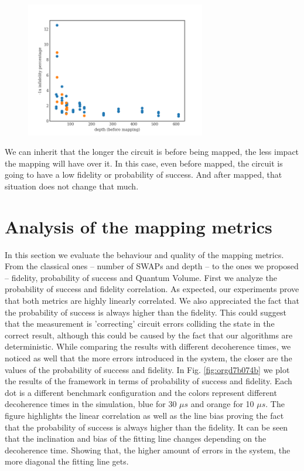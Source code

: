 \begin{figure}[htbp]
\centering
\includegraphics[width=0.7\textwidth]{figures/infid_percentage_depth_before_mapping.png}
\caption{\label{fig:org8ea3009}
}
\end{figure}

We can inherit that the longer the circuit is before being mapped, the less impact the mapping will have over it.
In this case, even before mapped, the circuit is going to have a low fidelity or probability of success.
And after mapped, that situation does not change that much.

\section{Analysis of the mapping metrics}
\label{sec:org3c983e1}

In this section we evaluate the behaviour and quality of the mapping metrics.
From the classical ones -- number of SWAPs and depth -- to the ones we proposed -- fidelity, probability of success and Quantum Volume.
First we analyze the probability of success and fidelity correlation.
As expected, our experiments prove that both metrics are highly linearly correlated.
We also appreciated the fact that the probability of success is always higher than the fidelity.
This could suggest that the measurement is 'correcting' circuit errors colliding the state in the correct result, although this could be caused by the fact that our algorithms are deterministic.
While comparing the results with different decoherence times, we noticed as well that the more errors introduced in the system, the closer are the values of the probability of success and fidelity.
In Fig. \ref{fig:orgd7b074b} we plot the results of the framework in terms of probability of success and fidelity. 
Each dot is a different benchmark configuration and the colors represent different decoherence times in the simulation, blue for 30 \(\mu s\) and orange for 10 \(\mu s\).
The figure highlights the linear correlation as well as the line bias proving the fact that the probability of success is always higher than the fidelity.
It can be seen that the inclination and bias of the fitting line changes depending on the decoherence time.
Showing that, the higher amount of errors in the system, the more diagonal the fitting line gets.

